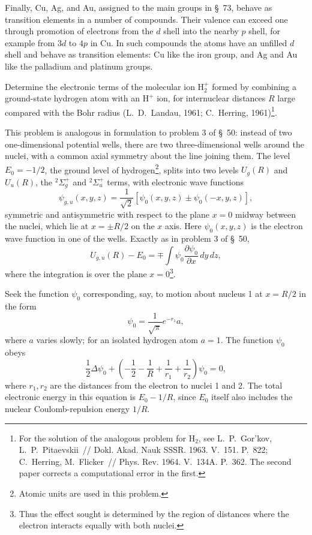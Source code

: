 Finally, Cu, Ag, and Au, assigned to the main groups in \S~73, behave as transition elements in a number of compounds. Their valence can exceed one through promotion of electrons from the $d$ shell into the nearby $p$ shell, for example from $3d$ to $4p$ in Cu. In such compounds the atoms have an unfilled $d$ shell and behave as transition elements: Cu like the iron group, and Ag and Au like the palladium and platinum groups.

\ProblemHeading Determine the electronic terms of the molecular ion $\mathrm H_2^+$ formed by combining a ground-state hydrogen atom with an $\mathrm H^+$ ion, for internuclear distances $R$ large compared with the Bohr radius (L.~D.~Landau, 1961; C.~Herring, 1961)\footnote{For the solution of the analogous problem for $\mathrm H_2$, see L.~P.~Gor'kov, L.~P.~Pitaevskii~// Dokl. Akad. Nauk SSSR. 1963. V.~151. P.~822; C.~Herring, M.~Flicker~// Phys. Rev. 1964. V.~134A. P.~362. The second paper corrects a computational error in the first.}.

\SolutionHeading This problem is analogous in formulation to problem 3 of \S~50: instead of two one-dimensional potential wells, there are two three-dimensional wells around the nuclei, with a common axial symmetry about the line joining them. The level $E_0=-1/2$, the ground level of hydrogen\footnote{Atomic units are used in this problem.}, splits into two levels $U_g(R)$ and $U_u(R)$, the ${}^2\Sigma_g^+$ and ${}^2\Sigma_u^+$ terms, with electronic wave functions
\[
\psi_{g,u}(x,y,z)=\frac1{\sqrt2}[\psi_0(x,y,z)\pm\psi_0(-x,y,z)],
\]
symmetric and antisymmetric with respect to the plane $x=0$ midway between the nuclei, which lie at $x=\pm R/2$ on the $x$ axis. Here $\psi_0(x,y,z)$ is the electron wave function in one of the wells. Exactly as in problem 3 of \S~50,
\begin{equation}U_{g,u}(R)-E_0=\mp\int\psi_0\frac{\partial\psi_0}{\partial x}\,dy\,dz,\tag{1}\end{equation}
where the integration is over the plane $x=0$\footnote{Thus the effect sought is determined by the region of distances where the electron interacts equally with both nuclei.}.

Seek the function $\psi_0$ corresponding, say, to motion about nucleus 1 at $x=R/2$ in the form
\begin{equation}\psi_0=\frac1{\sqrt\pi}e^{-r_1}a,\tag{2}\end{equation}
where $a$ varies slowly; for an isolated hydrogen atom $a=1$. The function $\psi_0$ obeys
\begin{equation}\frac12\Delta\psi_0+\left(-\frac12-\frac1R+\frac1{r_1}+\frac1{r_2}\right)\psi_0=0,\tag{3}\end{equation}
where $r_1,r_2$ are the distances from the electron to nuclei 1 and 2. The total electronic energy in this equation is $E_0-1/R$, since $E_0$ itself also includes the nuclear Coulomb-repulsion energy $1/R$.


